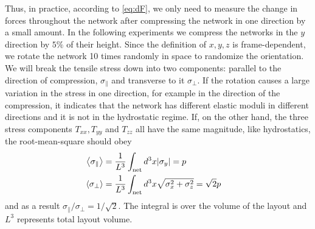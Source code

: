 \documentclass[nofootinbib,preprint,floatfix,endfloats]{revtex4} %
\begin{document}
Thus, in practice, according to \eqref{eq:dF}, we only need to measure the change in forces throughout the network after compressing the network in one direction by a small amount. 
In the following experiments we compress the networks in the $y$ direction by $5\%$ of their height. 
Since the definition of $x,y,z$ is frame-dependent, we rotate the network 10 times randomly in space to randomize the orientation. 
We will break the tensile stress down into two components: parallel to the direction of compression, $\sigma_\parallel$ and transverse to it $\sigma_\perp$. 
If the rotation causes a large variation in the stress in one direction, for example in the direction of the compression, it indicates that the network has different elastic moduli in different directions and it is not in the hydrostatic regime. 
If, on the other hand, the three stress components $T_{xx}, T_{yy}$ and $T_{zz}$ all have the same magnitude, like hydrostatics, the root-mean-square should obey
\begin{align}
\left<\sigma_\parallel\right> &={1\over L^3} \int_\mathrm{net} d^3x |\sigma_y| = p\cr
\left<\sigma_\perp\right> &= {1\over L^3} \int_\mathrm{net} d^3x \sqrt{\sigma_x^2+ \sigma_z^2} = \sqrt{2} p \label{eq:sigp}   
\end{align}
and as a result $ \sigma_\parallel/\sigma_\perp = 1/\sqrt{2}$. The integral is over the volume of the layout and $L^3$ represents total layout volume. 
\end{document}
